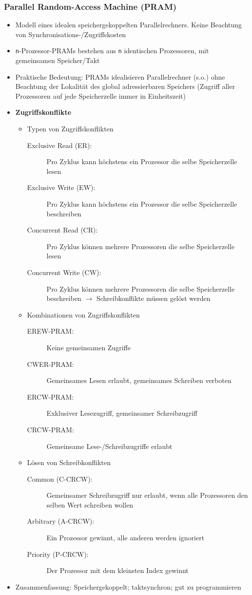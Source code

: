 \subsubsection{Parallel Random-Access Machine (PRAM)}
\begin{itemize}
	\item Modell eines idealen speichergekoppelten Parallelrechners. Keine Beachtung von Synchronisations-/Zugriffskosten
	\item \texttt{n}-Prozessor-PRAMs bestehen aus \texttt{n} identischen Prozessoren, mit gemeinsamen Speicher/Takt
	\item Praktische Bedeutung: PRAMs idealisieren Parallelrechner (s.o.) ohne Beachtung der Lokalität des global adressierbaren Speichers (Zugriff aller Prozessoren auf jede Speicherzelle immer in Einheitszeit)
	\item \textbf{Zugriffskonflikte}
	\begin{itemize}
		\item Typen von Zugriffskonflikten
		\begin{description}
			\item[Exclusive Read (ER):] Pro Zyklus kann höchstens ein Prozessor die selbe Speicherzelle lesen
			\item[Exclusive Write (EW):] Pro Zyklus kann höchstens ein Prozessor die selbe Speicherzelle beschreiben
			\item[Concurrent Read (CR):] Pro Zyklus können mehrere Prozessoren die selbe Speicherzelle lesen
			\item[Concurrent Write (CW):] Pro Zyklus können mehrere Prozessoren die selbe Speicherzelle beschreiben \(\rightarrow\) Schreibkonflikte müssen gelöst werden
		\end{description}
		\item Kombinationen von Zugriffskonflikten
		\begin{description}
			\item[EREW-PRAM:] Keine gemeinsamen Zugriffe
			\item[CWER-PRAM:] Gemeinsames Lesen erlaubt, gemeinsames Schreiben verboten
			\item[ERCW-PRAM:] Exklusiver Lesezugriff, gemeinsamer Schreibzugriff
			\item[CRCW-PRAM:] Gemeinsame Lese-/Schreibzugriffe erlaubt
		\end{description}
		\item Lösen von Schreibkonflikten
		\begin{description}
			\item[Common (C-CRCW):] Gemeinsamer Schreibzugriff nur erlaubt, wenn alle Prozessoren den selben Wert schreiben wollen
			\item[Arbitrary (A-CRCW):] Ein Prozessor gewinnt, alle anderen werden ignoriert
			\item[Priority (P-CRCW):] Der Prozessor mit dem kleinsten Index gewinnt
		\end{description}
	\end{itemize}
	\item Zusammenfassung: Speichergekoppelt; taktsynchron; gut zu programmieren
\end{itemize}

